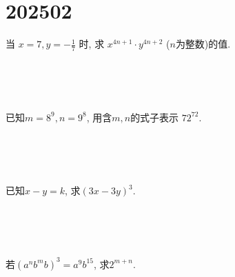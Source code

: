 \section{202502}

\item{
    当 $ x=7, y=-\frac{1}{7}$ 时, 求 $x^{4n+1}\cdot y^{4n+2}$ ($n$为整数)的值.
    \iffalse
    \fangsong\zihao{4}
    思路: 观察到$xy=-1$,让将$x$和$y$凑成一对,相乘.直接将$x, y$的值代入表达式中进行计算.
    
    解答: 
    \begin{align*}
        \mbox{原式} &= 7^{4n+1}\cdot \left(-\frac{1}{7}\right) ^{4n+2}\\
        &= [7\times(-\frac{1}{7})]^{4n+1} \cdot(-\frac{1}{7})\\
        &= (-1)^{4n+1} \cdot(-\frac{1}{7})\\
        &= \frac{1}{7}.
    \end{align*}
    \fi
} 
\\ \\ \\
\item{
    已知$ m=8^9, n=9^8 $, 用含$m, n$的式子表示 $72^{72}$.
    \iffalse
    \fangsong\zihao{4}
    思路: 观察到$72=8\times 9$,将原式中的72分解,凑出$m, n$.
    
    解答: 
    \begin{align*}
        \mbox{原式} &= (8\times 9)^{72}\\
        &= 8^{72}\times 9^{72}\\
        &= (8^9)^8\times (9^8)^9\\
        &= m^8 n^9.
    \end{align*}
    \fi
} 
\\ \\ \\
\item{
    已知$x-y=k$, 求$(3x-3y)^3.$
    \iffalse
    \fangsong\zihao{4}
    解答: 
    \begin{align*}
        \mbox{原式} &= [3(x-y)]^3\\
        &= 27(x-y)^3\\
        &= 27k^3.
    \end{align*}
    \fi
} 
\\ \\ \\
\item{
    若$(a^nb^mb)^3 = a^9 b^{15}$, 求$2^{m+n}$.
    \iffalse
    \fangsong\zihao{4}
    思路: 先将左边化简,再与右边比较,解出$m,n$.
    
    解答: 
    \begin{align*}
        (a^nb^{m+1})^3 &= a^9b^{15}\\
        a^{3n}b^{3m+3} &= a^9b^{15}
    \end{align*}
    $\therefore 3n=9, 3m+3=15$\\
    $\therefore n=3, m=4$
    \begin{align*}
        2^{m+n} &= 2^7\\
        &= 128.
    \end{align*}
    \fi
}
\\ \\ \\

